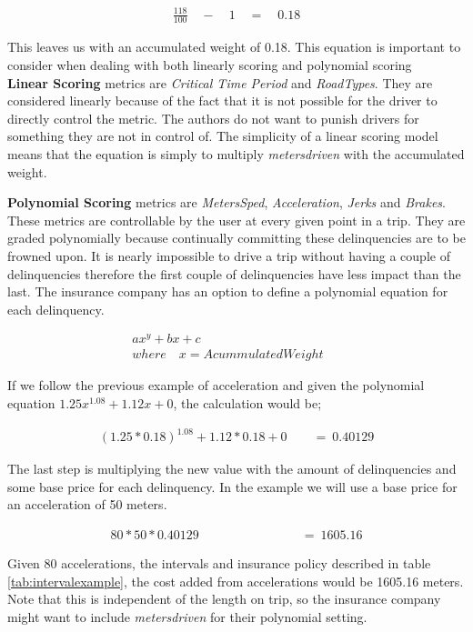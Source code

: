 \begin{align*}
\frac { 118 }{ 100 } \quad -\quad 1\quad =\quad 0.18
\end{align*}


This leaves us with an accumulated weight of 0.18. This equation is important to consider when dealing with both linearly scoring and polynomial scoring\\

\textbf{Linear Scoring} metrics are \textit{Critical Time Period} and \textit{RoadTypes}. They are considered linearly because of the fact that it is not possible for the driver to directly control the metric. The authors do not want to punish drivers for something they are not in control of. 
The simplicity of a linear scoring model means that the equation is simply to multiply \textit{metersdriven} with the accumulated weight.

\textbf{Polynomial Scoring} metrics are \textit{MetersSped}, \textit{Acceleration}, \textit{Jerks} and \textit{Brakes}. These metrics are controllable by the user at every given point in a trip. They are graded polynomially because continually committing these delinquencies are to be frowned upon. It is nearly impossible to drive a trip without having a couple of delinquencies therefore the first couple of delinquencies have less impact than the last. The insurance company has an option to define a polynomial equation for each delinquency.

\begin{align*}
ax^{y} + bx + c\quad \quad \quad \quad \quad \quad \quad \quad \quad \quad \quad \\
where\quad x = AcummulatedWeight
\end{align*}

If we follow the previous example of acceleration and given the polynomial equation $1.25x^{1.08} +  1.12x + 0$, the calculation would be;

\begin{align*}
(1.25 * 0.18)^{1.08} +  1.12 * 0.18 + 0\quad \quad  =\ 0.40129
\end{align*}

The last step is multiplying the new value with the amount of delinquencies and some base price for each delinquency. In the example we will use a base price for an acceleration of 50 meters.

\begin{align*}
80 * 50 * 0.40129\quad \quad \quad \quad \quad \quad \quad \quad =\ 1605.16
\end{align*}


Given 80 accelerations, the intervals and insurance policy described in table \ref{tab:intervalexample}, the cost added from accelerations would be 1605.16 meters. Note that this is independent of the length on trip, so the insurance company might want to include \textit{metersdriven} for their polynomial setting.